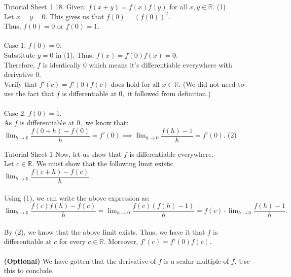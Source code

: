 \documentclass[aspectratio=169]{beamer}
\begin{document}
\begin{frame}{Tutorial Sheet 1}
	18. Given: $f(x + y) = f(x)f(y)$ for all $x, y \in \mathbb{R}.$ \hfill (1)\\
	Let $x = y = 0.$ This gives us that $f(0) = \left(f(0)\right)^2.$\\
	Thus, $f(0) = 0$ or $f(0) = 1.$\\~\\
	Case 1. $f(0) = 0.$\\
	Substitute $y = 0$ in (1). Thus, $f(x) = f(0)f(x) = 0.$\\
	Therefore, $f$ is identically $0$ which means it's differentiable everywhere with derivative $0.$ \\
	Verify that $f'(c) = f'(0)f(c)$ does hold for all $x \in \mathbb{R}.$ (We did not need to use the fact that $f$ is differentiable at $0,$ it followed from definition.)\\~\\
	Case 2. $f(0) = 1.$\\
	As $f$ is differentiable at $0,$ we know that:\\
	$\displaystyle\lim_{h\to 0}\dfrac{f(0+h) - f(0)}{h} = f'(0) \implies \displaystyle\lim_{h\to 0}\dfrac{f(h) - 1}{h} = f'(0).$ \hfill (2)\\
\end{frame}

\begin{frame}{Tutorial Sheet 1}
	Now, let us show that $f$ is differentiable everywhere.\\
	Let $c \in \mathbb{R}.$ We must show that the following limit exists:\\
	$\displaystyle\lim_{h\to 0}\dfrac{f(c + h) - f(c)}{h}$\\~\\
	Using (1), we can write the above expression as:\\
	$\displaystyle\lim_{h\to 0}\dfrac{f(c)f(h) - f(c)}{h} = \lim_{h\to 0}\dfrac{f(c)(f(h) - 1)}{h} = f(c)\cdot\lim_{h\to 0}\dfrac{f(h) - 1}{h}.$\\~\\
	By (2), we know that the above limit exists. Thus, we have it that $f$ is differentiable at $c$ for every $c \in \mathbb{R}.$ Moreover, $f'(c) = f'(0)f(c).$\\~\\
	\textbf{(Optional)} We have gotten that the derivative of $f$ is a scalar multiple of $f.$ Use this to conclude.	
\end{frame}
\end{document}

